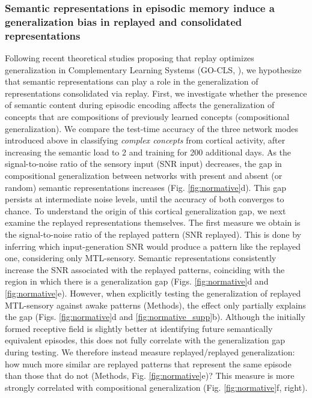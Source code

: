 \documentclass{article}
\begin{document}
\subsubsection*{Semantic representations in episodic memory induce a generalization bias in replayed and consolidated representations}
Following recent theoretical studies proposing that replay optimizes generalization in Complementary Learning Systems (GO-CLS, ), we hypothesize that semantic representations can play a role in the generalization of representations consolidated via replay.
\newline\newline
First, we investigate whether the presence of semantic content during episodic encoding affects the generalization of concepts that are compositions of previously learned concepts (compositional generalization). We compare the test-time accuracy of the three network modes introduced above in classifying \textit{complex concepts} from cortical activity, after increasing the semantic load to 2 and training for 200 additional days. As the signal-to-noise ratio of the sensory input (SNR input) decreases, the gap in compositional generalization between networks with present and absent (or random) semantic representations increases (Fig. \ref{fig:normative}d). This gap persists at intermediate noise levels, until the accuracy of both converges to chance.
\newline\newline
To understand the origin of this cortical generalization gap, we next examine the replayed representations themselves. The first measure we obtain is the signal-to-noise ratio of the replayed pattern (SNR replayed). This is done by inferring which input-generation SNR would produce a pattern like the replayed one, considering only MTL-sensory. Semantic representations consistently increase the SNR associated with the replayed patterns, coinciding with the region in which there is a generalization gap (Figs. \ref{fig:normative}d and \ref{fig:normative}e). However, when explicitly testing the generalization of replayed MTL-sensory against awake patterns (Methods), the effect only partially explains the gap (Figs. \ref{fig:normative}d and \ref{fig:normative_supp}b). Although the initially formed receptive field is slightly better at identifying future semantically equivalent episodes, this does not fully correlate with the generalization gap during testing. We therefore instead measure replayed/replayed generalization: how much more similar are replayed patterns that represent the same episode than those that do not (Methods, Fig. \ref{fig:normative}e)? This measure is more strongly correlated with compositional generalization (Fig. \ref{fig:normative}f, right).
\end{document}

